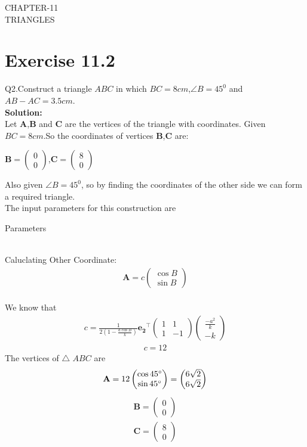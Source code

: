 \documentclass{article}
\newcommand{\myvec}[1]{\ensuremath{\begin{pmatrix}#1\end{pmatrix}}}
\let\vec\mathbf
\begin{document}
\begin{center}
        \textbf\large{CHAPTER-11 \\ TRIANGLES}
\end{center}
\section{Exercise 11.2}
Q2.Construct a triangle $ABC$ in which $BC=8cm$,$\angle{B}=45^0$ and $AB-AC=3.5cm$. \\
\textbf{Solution:}\\
Let $\vec{A}$,$\vec{B}$ and $\vec{C}$ are the vertices of the triangle with coordinates.
Given $BC=8cm$.So the coordinates of vertices $\vec{B}$,$\vec{C}$ are:
\begin{center}
{
$\vec{B} =\myvec{0\\0}$,$\vec{C} =\myvec{8\\0}$
}
\end{center}
Also given $\angle{B}=45^0$, so by finding the coordinates of the other side we can form a required triangle. \\
 The input parameters for this construction are
 \begin{table}[h]
	  \centering
	  
	  \caption{Parameters}
	  \label{tab:Table1}
\end{table}\\
Caluclating Other Coordinate:
  \begin{align}
	  \vec{A} = c\myvec{\cos{B}\\\sin{B}}
	  \end{align}\\
We know that\\
\begin{align}  
      c    
        =
	\frac{1}{2(1-\frac{a\cos{B}}{k})}
	 \vec{e_2}^{\top}
	\myvec{1 & 1\\1 & -1}
	\myvec{\frac{-a^2}{k}\\-k}
     \end{align}
  \begin{align}
	 c = 12
      \end{align}		
The vertices of $\triangle$ $ABC$ are \\
\begin{align}
\vec{A} = 12\myvec{\cos 45\degree\\\sin 45\degree}
	 = \myvec{6\sqrt{2}\\6\sqrt{2}}
\end{align}
\begin{align}
 \vec{B} = \myvec{0\\0}\\
 \vec{C} = \myvec{8\\0}
 \end{align} 	      
\end{document}
